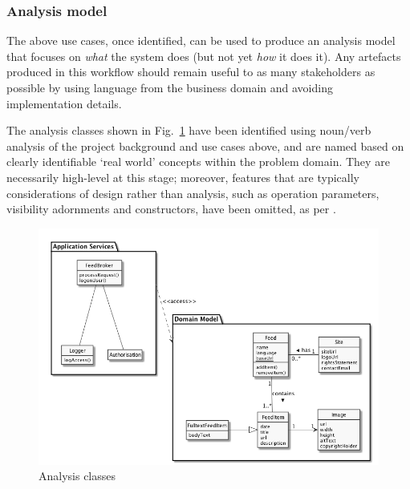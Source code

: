 \documentclass[runningheads,a4paper]{llncs}
\begin{document}
\subsubsection{Analysis model}

The above use cases, once identified, can be used to produce an analysis model that focuses on \textit{what} the system does (but not yet \textit{how} it does it). Any artefacts produced in this workflow should remain useful to as many stakeholders as possible by using language from the business domain and avoiding implementation details.

The analysis classes shown in Fig.~\ref{fig:analysis-classes-diagram} have been identified using noun/verb analysis of the project background and use cases above, and are named based on clearly identifiable `real world' concepts within the problem domain. They are necessarily high-level at this stage; moreover, features that are typically considerations of design rather than analysis, such as operation parameters, visibility adornments and constructors, have been omitted, as per \cite{arlow}.

\begin{figure}
\centering
\includegraphics[width=\textwidth]{analysis-classes}
\caption{Analysis classes}
\label{fig:analysis-classes-diagram}
\end{figure}
\end{document}
